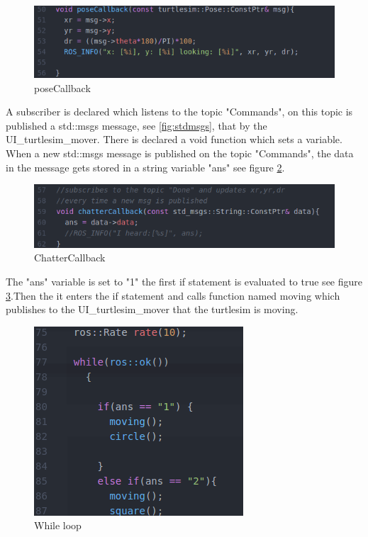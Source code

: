 \begin{figure}[h]
\begin{center}
\includegraphics[width=.5\textwidth]{figures/posecall.png}
\caption{poseCallback}\label{fig:pose}
\end{center} 
\end{figure}

A subscriber is declared which listens to the topic "Commands", on this topic is published a std::msgs message, see \ref{fig:stdmsgs}, that by the UI\_turtlesim\_mover. There is declared a void function which sets a variable. When a new std::msgs message is published on the topic "Commands", the data in the message gets stored in a string variable "ans" see figure \ref{fig:ChatterCallback}.\\
\begin{figure}[h!]
\begin{center}
\includegraphics[width=.5\textwidth]{figures/chatterCallback.png}
\caption{ChatterCallback}\label{fig:ChatterCallback}
\end{center}
\end{figure}


The "ans" variable is set to "1" the first if statement is evaluated to true see figure \ref{fig:while}.Then the it enters the if statement and calls function named moving which publishes to the UI\_turtlesim\_mover that the turtlesim is moving.\\

\begin{figure}[h]
\begin{center}
\includegraphics[width=.5\textwidth]{figures/while.png}
\caption{While loop}\label{fig:while}
\end{center}
\end{figure}

